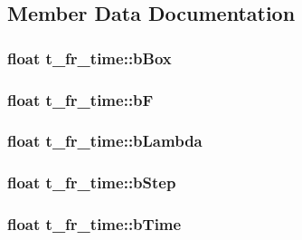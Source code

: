 \subsection{\-Member \-Data \-Documentation}
\hypertarget{structt__fr__time_a05794688d12d34c121f33f47f8f93452}{
\subsubsection[{b\-Box}]{\setlength{\rightskip}{0pt plus 5cm}float {\bf t\-\_\-fr\-\_\-time\-::b\-Box}}}\label{structt__fr__time_a05794688d12d34c121f33f47f8f93452}
\hypertarget{structt__fr__time_a25d7fcfdf6586d57878925632f3e2e9e}{
\subsubsection[{b\-F}]{\setlength{\rightskip}{0pt plus 5cm}float {\bf t\-\_\-fr\-\_\-time\-::b\-F}}}\label{structt__fr__time_a25d7fcfdf6586d57878925632f3e2e9e}
\hypertarget{structt__fr__time_af2f581e618ca2de05c6b63e82c52c645}{
\subsubsection[{b\-Lambda}]{\setlength{\rightskip}{0pt plus 5cm}float {\bf t\-\_\-fr\-\_\-time\-::b\-Lambda}}}\label{structt__fr__time_af2f581e618ca2de05c6b63e82c52c645}
\hypertarget{structt__fr__time_afb96ea6d6e523c32d3603bdf63348496}{
\subsubsection[{b\-Step}]{\setlength{\rightskip}{0pt plus 5cm}float {\bf t\-\_\-fr\-\_\-time\-::b\-Step}}}\label{structt__fr__time_afb96ea6d6e523c32d3603bdf63348496}
\hypertarget{structt__fr__time_a45f5e2c7ef45e8a51075a75aeb9c86fe}{
\subsubsection[{b\-Time}]{\setlength{\rightskip}{0pt plus 5cm}float {\bf t\-\_\-fr\-\_\-time\-::b\-Time}}}\label{structt__fr__time_a45f5e2c7ef45e8a51075a75aeb9c86fe}
